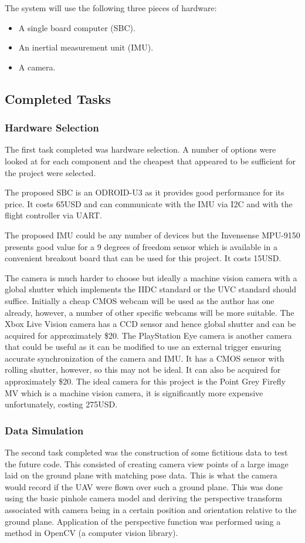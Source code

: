 \documentclass[a4paper,12pt]{article}
\begin{document}
The system will use the following three pieces of hardware:
\begin{itemize}
	\item A single board computer (SBC).
	\item An inertial measurement unit (IMU).
	\item A camera.
\end{itemize}


\subsection{Completed Tasks}
\subsubsection{Hardware Selection}
The first task completed was hardware selection. A number of options were looked at for each component and the cheapest that appeared to be sufficient for the project were selected.

The proposed SBC is an ODROID-U3 as it provides good performance for its price. It costs 65USD and can communicate with the IMU via I2C and with the flight controller via UART.

The proposed IMU could be any number of devices but the Invensense MPU-9150 presents good value for a 9 degrees of freedom sensor which is available in a convenient breakout board that can be used for this project. It costs 15USD.

The camera is much harder to choose but ideally a machine vision camera with a global shutter which implements the IIDC standard or the UVC standard should suffice. Initially a cheap CMOS webcam will be used as the author has one already, however, a number of other specific webcams will be more suitable. The Xbox Live Vision camera has a CCD sensor and hence global shutter and can be acquired for approximately \$20. The PlayStation Eye camera is another camera that could be useful as it can be modified to use an external trigger ensuring accurate synchronization of the camera and IMU. It has a CMOS sensor with rolling shutter, however, so this may not be ideal. It can also be acquired for approximately \$20. The ideal camera for this project is the Point Grey Firefly MV which is a machine vision camera, it is significantly more expensive unfortunately, costing 275USD.

\subsubsection{Data Simulation}
The second task completed was the construction of some fictitious data to test the future code. This consisted of creating camera view points of a large image
 laid on the ground plane with matching pose data. This is what the camera would record if the UAV were flown over such a ground plane. This was done using the basic pinhole camera model and deriving the perspective transform associated with camera being in a certain position and orientation relative to the ground plane. Application of the perspective function was performed using a method in OpenCV (a computer vision library).
\end{document}
